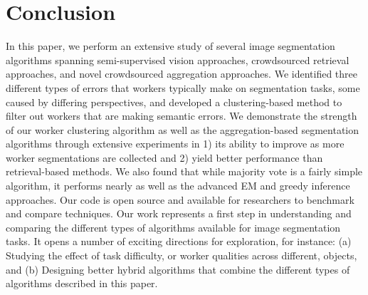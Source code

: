 \section{Conclusion}
In this paper, we perform an extensive study of several image segmentation algorithms spanning semi-supervised vision approaches, crowdsourced retrieval approaches, and novel crowdsourced aggregation approaches. We identified three different types of errors that workers typically make on segmentation tasks, some caused by differing perspectives, and developed a clustering-based method to filter out workers that are making semantic errors. We demonstrate the strength of our worker clustering algorithm as well as the aggregation-based segmentation algorithms through extensive experiments in 1) its ability to improve as more worker segmentations are collected and 2) yield better performance than retrieval-based methods. We also found that while majority vote is a fairly simple algorithm, it performs nearly as well as the advanced EM and greedy inference approaches. Our code is open source and available for researchers to benchmark and compare techniques. Our work represents a first step in understanding and comparing the different types of algorithms available for image segmentation tasks. It opens a number of exciting directions for exploration, for instance: (a) Studying the effect of task difficulty, or worker qualities across different, objects, and (b) Designing better hybrid algorithms that combine the different types of algorithms described in this paper.